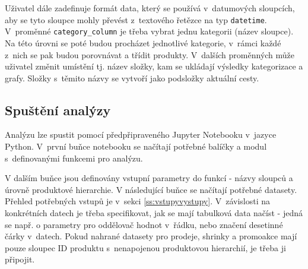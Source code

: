 
Uživatel dále zadefinuje formát data, který se používá v~datumových sloupcích, aby se tyto sloupce mohly převést z~textového řetězce na typ \texttt{datetime}. V~proměnné \texttt{category\_column} je třeba vybrat jednu kategorii (název sloupce). Na této úrovni se poté budou procházet jednotlivé kategorie, v~rámci každé z~nich se pak budou porovnávat a třídit produkty. V~dalších proměnných může uživatel změnit umístění tj. název složky, kam se ukládají výsledky kategorizace a grafy. Složky s~těmito názvy se vytvoří jako podsložky aktuální cesty.


\subsection{Spuštění analýzy}

Analýzu lze spustit pomocí předpřipraveného Jupyter Notebooku v~jazyce Python. V~první buňce notebooku se načítají potřebné balíčky a modul s~definovanými funkcemi pro analýzu.

V dalším buňce jsou definovány vstupní parametry do funkcí - názvy sloupců a úrovně produktové hierarchie.
V následující buňce se načítají potřebné datasety. Přehled potřebných vstupů je v~sekci \ref*{ss:vstupyvystupy}. V~závislosti na konkrétních datech je třeba specifikovat, jak se mají tabulková data načíst - jedná se např. o parametry pro oddělovač hodnot v~řádku, nebo značení desetinné čárky v~datech. Pokud nahrané datasety pro prodeje, shrinky a promoakce mají pouze sloupec ID produktu s~nenapojenou produktovou hierarchií, je třeba ji připojit.

